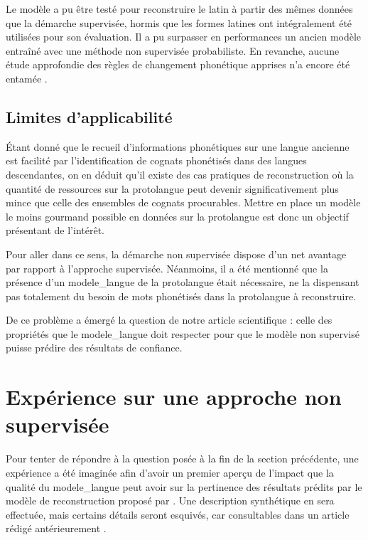 \documentclass[12pt, twoside]{report}
\begin{document}
\vspace{12pt}
Le modèle a pu être testé pour reconstruire le latin à partir des mêmes données que la démarche supervisée, hormis que les formes latines ont intégralement été utilisées pour son évaluation. Il a pu surpasser en performances un ancien modèle entraîné avec une méthode non supervisée probabiliste. En revanche, aucune étude approfondie des règles de changement phonétique apprises n'a encore été entamée \autocite[section 7]{he2022neural}.

\subsection{Limites d'applicabilité}
Étant donné que le recueil d'informations phonétiques sur une langue ancienne est facilité par l'identification de \glspl{cognat} phonétisés dans des langues descendantes, on en déduit qu'il existe des cas pratiques de reconstruction où la quantité de ressources sur la protolangue peut devenir significativement plus mince que celle des ensembles de \glspl{cognat} procurables. Mettre en place un modèle le moins gourmand possible en données sur la protolangue est donc un objectif présentant de l'intérêt.

Pour aller dans ce sens, la démarche non supervisée dispose d'un net avantage par rapport à l'approche supervisée. Néanmoins, il a été mentionné que la présence d'un \gls{modele_langue} de la protolangue était nécessaire, ne la dispensant pas totalement du besoin de mots phonétisés dans la protolangue à reconstruire.

De ce problème a émergé la question de notre article scientifique : celle des propriétés que le \gls{modele_langue} doit respecter pour que le modèle non supervisé puisse prédire des résultats de confiance.

\section{Expérience sur une approche non supervisée}

Pour tenter de répondre à la question posée à la fin de la section précédente, une expérience a été imaginée afin d'avoir un premier aperçu de l'impact que la qualité du \gls{modele_langue} peut avoir sur la pertinence des résultats prédits par le modèle de reconstruction proposé par \autocite{he2022neural}. Une description synthétique en sera effectuée, mais certains détails seront esquivés, car consultables dans un article rédigé antérieurement \autocite{notreArticle}.\\%
\end{document}
